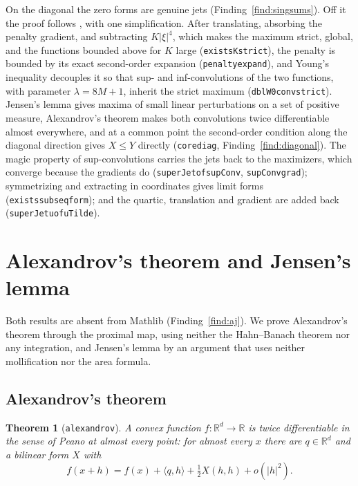 \documentclass[11pt,reqno]{amsart}
\newcommand{\LEANREF}[1]{\texttt{\small\def\_{\textunderscore\allowbreak}#1}}
\newcommand{\R}{\mathbb{R}}
\theoremstyle{plain}
\newtheorem{theorem}{Theorem}[section]
\theoremstyle{definition}
\begin{document}
On the diagonal the zero forms are genuine jets
(Finding~\ref{find:singsums}). Off it the proof follows \cite[Thm.~3.2]{CIL92},
with one simplification. After translating, absorbing the penalty gradient, and
subtracting $K|\xi|^4$, which makes the maximum strict, global, and the functions
bounded above for $K$ large (\LEANREF{exists\_K\_strict}), the penalty is
bounded by its exact second-order expansion (\LEANREF{penalty\_expand}), and
Young's inequality decouples it so that sup- and inf-convolutions of the two
functions, with parameter $\lambda = 8M + 1$, inherit the strict maximum
(\LEANREF{dblW0\_conv\_strict}). Jensen's lemma gives maxima of small linear
perturbations on a set of positive measure, Alexandrov's theorem makes both
convolutions twice differentiable almost everywhere, and at a common point the
second-order condition along the diagonal direction gives $X \le Y$ directly
(\LEANREF{core\_diag}, Finding~\ref{find:diagonal}). The magic property of
sup-convolutions \cite[Lemma~A.5]{CIL92} carries the jets back to the
maximizers, which converge because the gradients do
(\LEANREF{superJet\_of\_supConv}, \LEANREF{supConv\_grad}); symmetrizing and
extracting in coordinates gives limit forms (\LEANREF{exists\_subseq\_form});
and the quartic, translation and gradient are added back
(\LEANREF{superJet\_u\_of\_uTilde}).

\section{Alexandrov's theorem and Jensen's lemma}\label{sec:aj}

Both results are absent from Mathlib (Finding~\ref{find:aj}). We prove
Alexandrov's theorem \cite{Ale39} through the proximal map, using neither the
Hahn--Banach theorem nor any integration, and Jensen's lemma \cite{Jen88} by an
argument that uses neither mollification nor the area formula.

\subsection{Alexandrov's theorem}\label{ssec:alexandrov}

\begin{theorem}[\LEANREF{alexandrov}]\label{thm:alexandrov}
A convex function $f\colon \R^d \to \R$ is twice differentiable in the sense of
Peano at almost every point: for almost every $x$ there are $q \in \R^d$ and a
bilinear form $X$ with
\[
  f(x + h) = f(x) + \langle q, h\rangle + \tfrac12 X(h, h) + o(|h|^2).
\]
\end{theorem}
\end{document}
